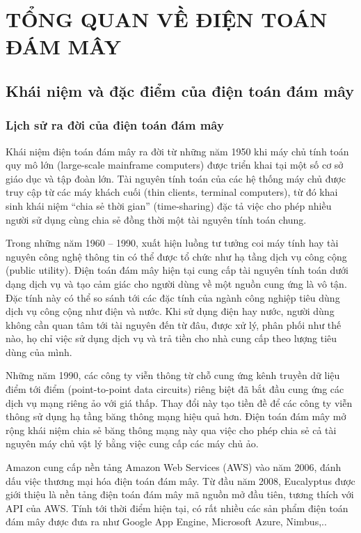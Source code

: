 \section{TỔNG QUAN VỀ ĐIỆN TOÁN ĐÁM MÂY}
\subsection{Khái niệm và đặc điểm của điện toán đám mây}
\subsubsection{Lịch sử ra đời của điện toán đám mây}
Khái niệm điện toán đám mây ra đời từ những năm 1950 khi máy chủ tính toán quy mô lớn (large-scale mainframe computers) được triển khai tại một số cơ sở giáo dục và tập đoàn lớn. Tài nguyên tính toán của các hệ thống máy chủ được truy cập từ các máy khách cuối (thin clients, terminal computers), từ đó khai sinh khái niệm “chia sẻ thời gian” (time-sharing) đặc tả việc cho phép nhiều người sử dụng cùng chia sẻ đồng thời một tài nguyên tính toán chung.

Trong những năm 1960 – 1990, xuất hiện luồng tư tưởng coi máy tính hay tài nguyên công nghệ thông tin có thể được tổ chức như hạ tầng dịch vụ công cộng (public utility). Điện toán đám mây hiện tại cung cấp tài nguyên tính toán dưới dạng dịch vụ và tạo cảm giác cho người dùng về một nguồn cung ứng là vô tận. Đặc tính này có thể so sánh tới các đặc tính của ngành công nghiệp tiêu dùng dịch vụ công cộng như điện và nước. Khi sử dụng điện hay nước, người dùng không cần quan tâm tới tài nguyên đến từ đâu, được xử lý, phân phối như thế nào, họ chỉ việc sử dụng dịch vụ và trả tiền cho nhà cung cấp theo lượng tiêu dùng của mình.

Những năm 1990, các công ty viễn thông từ chỗ cung ứng kênh truyền dữ liệu điểm tới điểm (point-to-point data circuits) riêng biệt đã bắt đầu cung ứng các dịch vụ mạng riêng ảo với giá thấp. Thay đổi này tạo tiền đề để các công ty viễn thông sử dụng hạ tầng băng thông mạng hiệu quả hơn. Điện toán đám mây mở rộng khái niệm chia sẻ băng thông mạng này qua việc cho phép chia sẻ cả tài nguyên máy chủ vật lý bằng việc cung cấp các máy chủ ảo.

Amazon cung cấp nền tảng Amazon Web Services (AWS) vào năm 2006, đánh dấu việc thương mại hóa điện toán đám mây. Từ đầu năm 2008, Eucalyptus được giới thiệu là nền tảng điện toán đám mây mã nguồn mở đầu tiên, tương thích với API của AWS. Tính tới thời điểm hiện tại, có rất nhiều các sản phẩm điện toán đám mây được đưa ra như Google App Engine, Microsoft Azure, Nimbus,..

